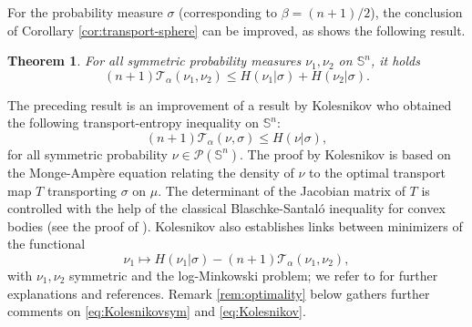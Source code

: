 \documentclass[10pt]{amsart}
\newtheorem{thm}{Theorem}[section]
\theoremstyle{definition}
\theoremstyle{remark}
\newcommand{\Sd}{\mathbb{S}}
\begin{document}
For the probability measure $\sigma$ (corresponding to $\beta = (n+1)/2$), the conclusion of Corollary \ref{cor:transport-sphere} can be improved, as shows the following result. 

\begin{thm}\label{thm:Kolesnikovsym}For all  symmetric probability measures $\nu_1,\nu_2$ on $\mathbb{S}^n$, it holds
\begin{equation}\label{eq:Kolesnikovsym}
(n+1)\mathcal{T}_\alpha(\nu_1,\nu_2) \leq H(\nu_1|\sigma) + H(\nu_2|\sigma).
\end{equation}
\end{thm}

The preceding result is an improvement of a result by Kolesnikov \cite{Kol20} who obtained the following transport-entropy inequality on $\Sd^n$:
\begin{equation}\label{eq:Kolesnikov}
(n+1)\mathcal{T}_\alpha(\nu,\sigma) \leq H(\nu|\sigma),
\end{equation}
 for all symmetric probability $\nu \in \mathcal{P}(\Sd^n)$. The proof by Kolesnikov is based on the Monge-Ampère equation relating the density of $\nu$ to the optimal transport map $T$ transporting $\sigma$ on $\mu$. 
 The determinant of the Jacobian matrix of $T$ is controlled with the help of the classical Blaschke-Santal\'o inequality for convex bodies (see the proof of \cite[Theorem 7.3]{Kol20}). Kolesnikov also establishes links between minimizers of the functional 
 \[
 \nu_1 \mapsto H(\nu_1|\sigma)-(n+1)\mathcal{T}_\alpha(\nu_1,\nu_2),
 \]
 with $\nu_1,\nu_2$ symmetric and the log-Minkowski problem; we refer to \cite{Kol20} for further explanations and references. Remark \ref{rem:optimality} below gathers further comments on \eqref{eq:Kolesnikovsym}  and \eqref{eq:Kolesnikov}.
 
\end{document}
